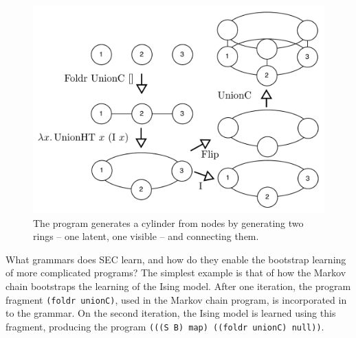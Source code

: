 \documentclass{article} %
\begin{document}
\begin{figure}
\includegraphics[width=0.45\linewidth]{./figures/cylinder.pdf}
\caption{The program generates a cylinder from nodes by generating two rings -- one latent, one visible -- and connecting them.}

\end{figure}

What grammars does SEC learn, and how do they enable the bootstrap learning of more complicated programs?
The simplest example is that of how the Markov chain bootstraps the learning of the Ising model.
After one iteration, the program fragment \verb|(foldr unionC)|, used in the Markov chain program, is incorporated in to the grammar.
On the second iteration, the Ising model is learned using this fragment, producing the program \verb|(((S B) map) ((foldr unionC) null))|.
\end{document}
